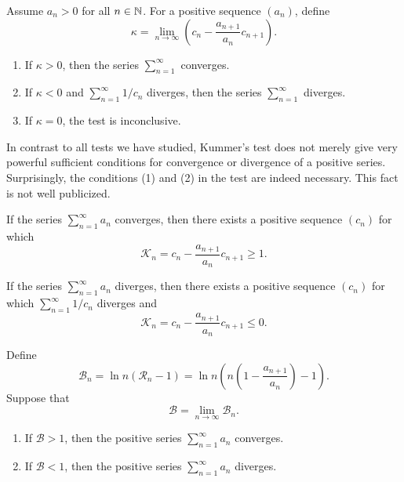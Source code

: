 \begin{proposition}
  Assume $a_n > 0$ for all $n \in \mathbb N$. For a positive sequence $(a_n)$, define
  \[ \kappa = \lim_{n \to \infty} \left(c_n - \frac{a_{n + 1}}{a_n}
  c_{n + 1}\right). \]
  \begin{enumerate}
    \item If $\kappa > 0$, then the series $\sum_{n = 1}^{\infty}$ converges.
    \item If $\kappa < 0$ and $\sum_{n = 1}^{\infty} 1/c_n$ diverges,
      then the series $\sum_{n = 1}^{\infty}$ diverges.
    \item If $\kappa = 0$, the test is inconclusive.
  \end{enumerate}
\end{proposition}

\begin{remark}
  In contrast to all tests we have studied, Kummer's test does not
  merely give very powerful sufficient conditions for convergence or
  divergence of a positive series. Surprisingly, the conditions (1)
  and (2) in the test are indeed necessary. This fact is not well publicized.
\end{remark}

\begin{theorem}
  If the series $\sum_{n = 1}^{\infty} a_n$ converges, then there
  exists a positive sequence $(c_n)$ for which
  \[ \mathcal{K}_n = c_n - \frac{a_{n + 1}}{a_n} c_{n + 1} \geq 1. \]
\end{theorem}

\begin{theorem}
  If the series $\sum_{n = 1}^{\infty} a_n$ diverges, then there
  exists a positive sequence $(c_n)$ for which
  $\sum_{n = 1}^{\infty} 1/c_n$ diverges and
  \[ \mathcal{K}_n = c_n - \frac{a_{n + 1}}{a_n} c_{n + 1} \leq 0. \]
\end{theorem}

\begin{proposition}
  Define
  \[ \mathcal{B}_n = \ln n (\mathcal{R}_n - 1) = \ln n \left(n
      \left(1 - \frac{a_{n +
  1}}{a_n}\right) - 1\right). \]
  Suppose that
  \[ \mathcal{B} = \lim_{n \to \infty} \mathcal{B}_n. \]
  \begin{enumerate}
    \item If $\mathcal{B} > 1$, then the positive series $\sum_{n = 1}^{\infty}
      a_n$ converges.
    \item If $\mathcal{B} < 1$, then the positive series $\sum_{n = 1}^{\infty}
      a_n$ diverges.
  \end{enumerate}
\end{proposition}


